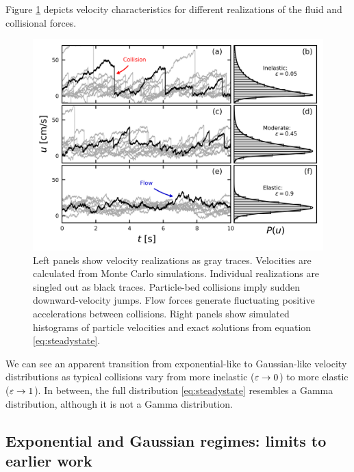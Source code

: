 Figure \ref{fig:fig2} depicts velocity characteristics for different realizations of the fluid and collisional forces.
\begin{figure}
	\centerline{\includegraphics{./figures/ch5/Fig2pdfs.png}}
	\caption{Left panels show velocity realizations as gray traces. Velocities are calculated from Monte Carlo simulations. Individual realizations are singled out as black traces. Particle-bed collisions imply sudden downward-velocity jumps. Flow forces generate fluctuating positive accelerations between collisions. Right panels show simulated histograms of particle velocities and exact solutions from equation \ref{eq:steadystate}.}
	\label{fig:fig2}
\end{figure}
We can see an apparent transition from exponential-like to Gaussian-like velocity distributions as typical collisions vary from more inelastic ($\varepsilon \rightarrow 0$) to more elastic ($\varepsilon \rightarrow 1$). In between, the full distribution \ref{eq:steadystate} resembles a Gamma distribution, although it is not a Gamma distribution.


\subsection{Exponential and Gaussian regimes: limits to earlier work}
\label{sec:modelcomparison}

